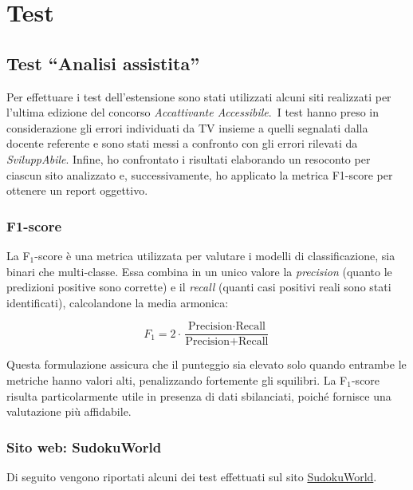 \chapter{Test}
\label{chap:test}

\section{Test ``Analisi assistita''}
\noindent Per effettuare i test dell’estensione sono stati utilizzati alcuni siti realizzati per l’ultima edizione del concorso \textit{Accattivante Accessibile}.\
I test hanno preso in considerazione gli errori individuati da TV insieme a quelli segnalati dalla docente referente e sono stati messi a confronto con gli errori rilevati da \textit{SviluppAbile}.
Infine, ho confrontato i risultati elaborando un resoconto per ciascun sito analizzato e, successivamente, ho applicato la metrica F1-score per ottenere un report oggettivo.

\subsection{F1-score} 
\noindent La F$_1$-score è una metrica utilizzata per valutare i modelli di classificazione, sia binari che multi‐classe. 
Essa combina in un unico valore la \textit{precision} (quanto le predizioni positive sono corrette) e il \textit{recall} (quanti casi positivi reali sono stati identificati), calcolandone la media armonica:

\[
F_{1} = 2 \cdot \frac{\text{Precision} \cdot \text{Recall}}{\text{Precision} + \text{Recall}}
\]

\noindent Questa formulazione assicura che il punteggio sia elevato solo quando entrambe le metriche hanno valori alti, penalizzando fortemente gli squilibri. 
La F$_1$-score risulta particolarmente utile in presenza di dati sbilanciati, poiché fornisce una valutazione più affidabile.

\subsection{Sito web: SudokuWorld}
\noindent Di seguito vengono riportati alcuni dei test effettuati sul sito \href{https://caa.studenti.math.unipd.it/amonaco/Sudokuworld/pages/home.php}{SudokuWorld}.

